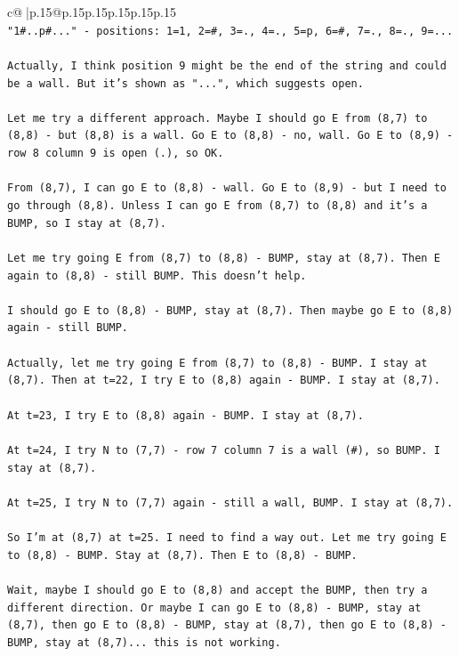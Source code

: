 \documentclass{article}
\begin{document}
{\begin{supertabular}{c@{$\;$}|p{.15\linewidth}@{}p{.15\linewidth}p{.15\linewidth}p{.15\linewidth}p{.15\linewidth}p{.15\linewidth}}
{{{\\ 
\texttt{"1\#..p\#..." {-} positions: 1=1, 2=\#, 3=., 4=., 5=p, 6=\#, 7=., 8=., 9=... } \\
\\ 
\texttt{Actually, I think position 9 might be the end of the string and could be a wall. But it's shown as "...", which suggests open.} \\
\\ 
\texttt{Let me try a different approach. Maybe I should go E from (8,7) to (8,8) {-} but (8,8) is a wall. Go E to (8,8) {-} no, wall. Go E to (8,9) {-} row 8 column 9 is open (.), so OK.} \\
\\ 
\texttt{From (8,7), I can go E to (8,8) {-} wall. Go E to (8,9) {-} but I need to go through (8,8). Unless I can go E from (8,7) to (8,8) and it's a BUMP, so I stay at (8,7).} \\
\\ 
\texttt{Let me try going E from (8,7) to (8,8) {-} BUMP, stay at (8,7). Then E again to (8,8) {-} still BUMP. This doesn't help.} \\
\\ 
\texttt{I should go E to (8,8) {-} BUMP, stay at (8,7). Then maybe go E to (8,8) again {-} still BUMP. } \\
\\ 
\texttt{Actually, let me try going E from (8,7) to (8,8) {-} BUMP. I stay at (8,7). Then at t=22, I try E to (8,8) again {-} BUMP. I stay at (8,7).} \\
\\ 
\texttt{At t=23, I try E to (8,8) again {-} BUMP. I stay at (8,7).} \\
\\ 
\texttt{At t=24, I try N to (7,7) {-} row 7 column 7 is a wall (\#), so BUMP. I stay at (8,7).} \\
\\ 
\texttt{At t=25, I try N to (7,7) again {-} still a wall, BUMP. I stay at (8,7).} \\
\\ 
\texttt{So I'm at (8,7) at t=25. I need to find a way out. Let me try going E to (8,8) {-} BUMP. Stay at (8,7). Then E to (8,8) {-} BUMP. } \\
\\ 
\texttt{Wait, maybe I should go E to (8,8) and accept the BUMP, then try a different direction. Or maybe I can go E to (8,8) {-} BUMP, stay at (8,7), then go E to (8,8) {-} BUMP, stay at (8,7), then go E to (8,8) {-} BUMP, stay at (8,7)... this is not working.} \\
}}}
\end{supertabular}}
\end{document}
